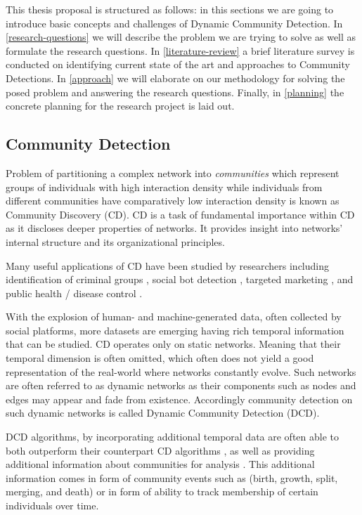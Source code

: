 \documentclass[
acmsmall,
nonacm,
screen,
acmthm]{../../scripts/pandoc/templates/acmart}
\begin{document}
This thesis proposal is structured as follows: in this sections we are
going to introduce basic concepts and challenges of Dynamic Community
Detection. In \cref{research-questions} we will describe the problem we
are trying to solve as well as formulate the research questions. In
\cref{literature-review} a brief literature survey is conducted on
identifying current state of the art and approaches to Community
Detections. In \cref{approach} we will elaborate on our methodology for
solving the posed problem and answering the research questions. Finally,
in \cref{planning} the concrete planning for the research project is
laid out.

\hypertarget{community-detection}{%
\subsection{Community Detection}\label{community-detection}}

Problem of partitioning a complex network into \emph{communities} which
represent groups of individuals with high interaction density while
individuals from different communities have comparatively low
interaction density is known as Community Discovery (CD). CD is a task
of fundamental importance within CD as it discloses deeper properties of
networks. It provides insight into networks' internal structure and its
organizational principles.

Many useful applications of CD have been studied by researchers
including identification of criminal groups
\citep{sarvariConstructingAnalyzingCriminal2014}, social bot detection
\citep{karatasReviewSocialBot2017}, targeted marketing
\citep{mosadeghUsingSocialNetwork2011}, and public health / disease
control \citep{salatheDynamicsControlDiseases2010}.

With the explosion of human- and machine-generated data, often collected
by social platforms, more datasets are emerging having rich temporal
information that can be studied. CD operates only on static networks.
Meaning that their temporal dimension is often omitted, which often does
not yield a good representation of the real-world where networks
constantly evolve. Such networks are often referred to as dynamic
networks as their components such as nodes and edges may appear and fade
from existence. Accordingly community detection on such dynamic networks
is called Dynamic Community Detection (DCD).

DCD algorithms, by incorporating additional temporal data are often able
to both outperform their counterpart CD algorithms
\citet{faniUserCommunityDetection2020}, as well as providing additional
information about communities for analysis
\citep{pallaQuantifyingSocialGroup2007}. This additional information
comes in form of community events such as (birth, growth, split,
merging, and death) or in form of ability to track membership of certain
individuals over time.
\end{document}
